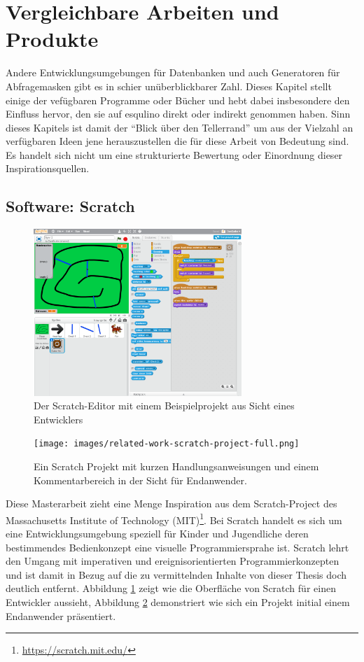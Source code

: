 \section{Vergleichbare Arbeiten und Produkte}
\label{sec:related-work}

Andere Entwicklungsumgebungen für Datenbanken und auch Generatoren für Abfragemasken gibt es in schier unüberblickbarer Zahl. Dieses Kapitel stellt einige der vefügbaren Programme oder Bücher und hebt dabei insbesondere den Einfluss hervor, den sie auf esqulino direkt oder indirekt genommen haben. Sinn dieses Kapitels ist damit der "`Blick über den Tellerrand"' um aus der Vielzahl an verfügbaren Ideen jene herauszustellen die für diese Arbeit von Bedeutung sind. Es handelt sich nicht um eine strukturierte Bewertung oder Einordnung dieser Inspirationsquellen.

\subsection{Software: Scratch}

\begin{figure}[p]
  \centering \includegraphics[width=0.7\textwidth]{images/related-work-scratch-editor-full.png}
  \caption{Der Scratch-Editor mit einem Beispielprojekt aus Sicht eines Entwicklers}
  \label{fig:scratch-editor-full}
\end{figure}

\begin{figure}[p]
  \centering \texttt{[image: images/related-work-scratch-project-full.png]}
  \caption{Ein Scratch Projekt mit kurzen Handlungsanweisungen und einem Kommentarbereich in der Sicht für Endanwender.}
  \label{fig:scratch-enduser-full}
\end{figure}

Diese Masterarbeit zieht eine Menge Inspiration aus dem Scratch-Project des Massachusetts Institute of Technology (MIT)\footnote{\url{https://scratch.mit.edu/}}. Bei Scratch handelt es sich um eine Entwicklungsumgebung speziell für Kinder und Jugendliche deren bestimmendes Bedienkonzept eine visuelle Programmiersprahe ist. Scratch lehrt den Umgang mit imperativen und ereignisorientierten Programmierkonzepten und ist damit in Bezug auf die zu vermittelnden Inhalte von dieser Thesis doch deutlich entfernt. Abbildung \ref{fig:scratch-editor-full} zeigt wie die Oberfläche von Scratch für einen Entwickler aussieht, Abbildung \ref{fig:scratch-enduser-full} demonstriert wie sich ein Projekt initial einem Endanwender präsentiert.

